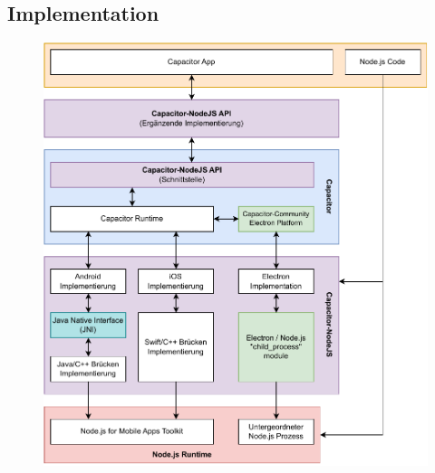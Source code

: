 \subsection{Implementation}

\begin{figure}[H]
    \centering
    \includegraphics[width=\textwidth]{assets/02_Capacitor-NodeJS/03_Aufbau.drawio.pdf}
\end{figure}


\clearpage
